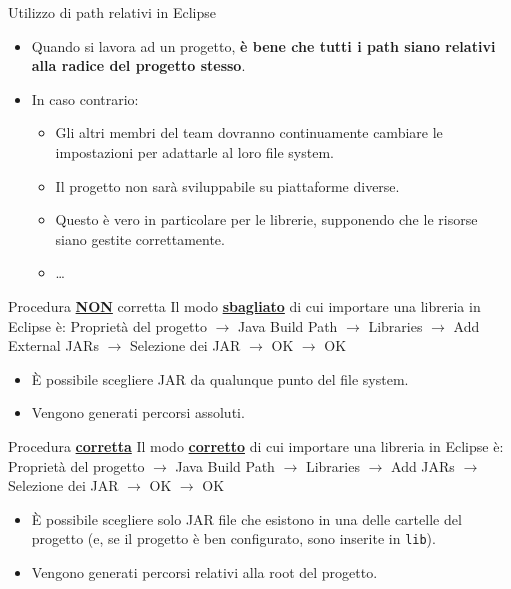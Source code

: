 \documentclass[presentation]{beamer}
\begin{document}
\begin{frame}[allowframebreaks]{Utilizzo di path relativi in Eclipse}
	\begin{itemize}\itemsep20pt
		\item Quando si lavora ad un progetto, \textbf{è bene che tutti i path siano relativi alla radice del progetto stesso}.
		\item In caso contrario:
		\begin{itemize}
			\item Gli altri membri del team dovranno continuamente cambiare le impostazioni per adattarle al loro file system.
			\item Il progetto non sarà sviluppabile su piattaforme diverse.
			\item Questo è vero in particolare per le librerie, supponendo che le risorse siano gestite correttamente.
			\item \dots
		\end{itemize}
	\end{itemize}
	\begin{block}{Procedura \textbf{\underline{NON}} corretta}
		Il modo \textbf{\underline{sbagliato}} di cui importare una libreria in Eclipse è: Proprietà del progetto $\rightarrow$ Java Build Path $\rightarrow$ Libraries $\rightarrow$ Add External JARs $\rightarrow$ Selezione dei JAR $\rightarrow$ OK $\rightarrow$ OK
		\begin{itemize}
			\item \`{E} possibile scegliere JAR da qualunque punto del file system.
			\item Vengono generati percorsi assoluti.
		\end{itemize}
	\end{block}
	\begin{block}{Procedura \textbf{\underline{corretta}}}
		Il modo \textbf{\underline{corretto}} di cui importare una libreria in Eclipse è: Proprietà del progetto $\rightarrow$ Java Build Path $\rightarrow$ Libraries $\rightarrow$ Add JARs $\rightarrow$ Selezione dei JAR $\rightarrow$ OK $\rightarrow$ OK
		\begin{itemize}
			\item \`{E} possibile scegliere solo JAR file che esistono in una delle cartelle del progetto (e, se il progetto è ben configurato, sono inserite in \texttt{lib}).
			\item Vengono generati percorsi relativi alla root del progetto.
		\end{itemize}
	\end{block}
\end{frame}
\end{document}

